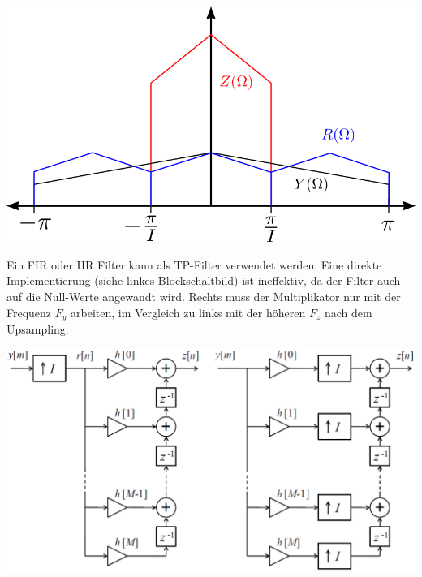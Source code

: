 \begin{center}
	\includegraphics[width=.45\textwidth]{../fig/interpolation_frequenz.png}
\end{center}
Ein FIR oder IIR Filter kann als TP-Filter verwendet werden. Eine direkte
Implementierung (siehe linkes Blockschaltbild) ist ineffektiv, da der 
Filter auch auf die Null-Werte angewandt wird. Rechts muss der Multiplikator
nur mit der Frequenz $F_y$ arbeiten, im Vergleich zu links mit der höheren $F_z$
nach dem Upsampling.
\begin{center}
	\includegraphics[width=.7\textwidth]{../fig/interpolation_scheme}
\end{center}

